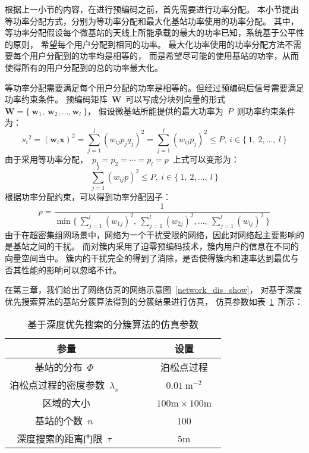 根据上一小节的内容，在进行预编码之前，首先需要进行功率分配。
本小节提出等功率分配方式，分别为等功率分配和最大化基站功率使用的功率分配。
其中，等功率分配假设每个微基站的天线上所能承载的最大的功率已知，系统基于公平性的原则，
希望每个用户分配到相同的功率。
最大化功率使用的功率分配方法不需要每个用户分配到的功率均是相等的，
而是希望尽可能的使用基站的功率，从而使得所有的用户分配到的总的功率最大化。

等功率分配需要满足每个用户分配的功率是相等的。但经过预编码后信号需要满足功率约束条件。
预编码矩阵~$\mathbf{W}$~可以写成分块列向量的形式
~$\mathbf{W}=\{~\mathbf{w}_1,~\mathbf{w}_2,\dots,\mathbf{w}_l~\}$，
假设微基站所能提供的最大功率为~$P$~则功率约束条件为：
\begin{equation}\label{P_constrain}
  {s_i}^2 = (\mathbf{w}_i \mathbf{x})^2 = \sum_{j=1}^l (w_{ij} p_j q_j)^2
  = \sum_{j=1}^l (w_{ij} p_j)^2 \leq P ,~ i\in \{~1,~2, \dots, ~l~\}
\end{equation}
由于采用等功率分配，~$p_1=p_2=\cdots=p_l=p$~上式可以变形为：
\begin{equation}
  \sum_{j=1}^{l} (w_{ij}p)^2 \le P ,~ i\in \{~1,~2, \dots, ~l~\}
\end{equation}
根据功率分配约束，可以得到功率分配因子：
\begin{equation}
  p=\frac{1}{\min\{~\sum_{j=1}^{l} (w_{1j})^2,~\sum_{j=1}^{l} (w_{2j})^2,\dots,~\sum_{j=1}^{l} (w_{lj})^2~\}}
\end{equation}
由于在超密集组网场景中，网络为一个干扰受限的网络，因此对网络起主要影响的是基站之间的干扰。
而对簇内采用了迫零预编码技术，簇内用户的信息在不同的向量空间当中。
簇内的干扰完全的得到了消除，是否使得簇内和速率达到最优与否其性能的影响可以忽略不计。


在第三章，我们给出了网络仿真的网络示意图~\ref{network_dis_show}，
对基于深度优先搜索算法的基站分簇算法得到的分簇结果进行仿真，
仿真参数如表~\ref{dfs_show_sim_para}~所示：
\begin{table}[htbp]
\caption{基于深度优先搜索的分簇算法的仿真参数}
\label{dfs_show_sim_para}
\vspace{0.5em}\centering\wuhao
\begin{tabular}{cccc}
\toprule[1.5pt]
参量 & & & 设置 \\
\midrule[0.5pt]
基站的分布~$\Phi$~ & & & 泊松点过程 \\
泊松点过程的密度参数~$\lambda_s$~ & & & ~$0.01~\mathrm{m}^{-2}$~ \\
区域的大小  & & & ~$100\mathrm{m} \times 100 \mathrm{m}$~ \\
基站的个数~$n$~  & & & 100\\
深度搜索的距离门限~$\tau$~ & & & ~$5\mathrm{m}$~\\
\bottomrule[1.5pt]
\end{tabular}
\end{table}

